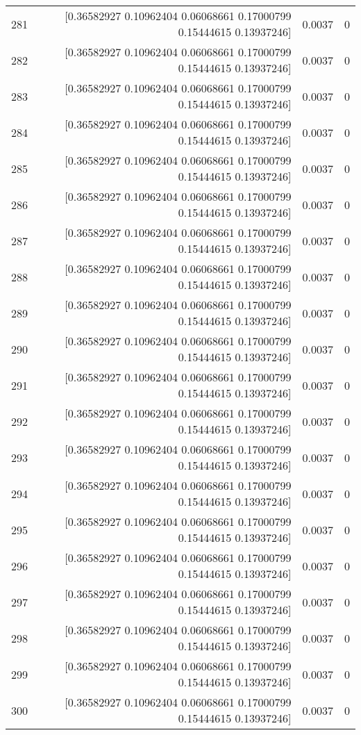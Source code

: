 \begin{longtable}{lrrr}
281 & [0.36582927 0.10962404 0.06068661 0.17000799 0.15444615 0.13937246] & 0.0037 & 0 \\
282 & [0.36582927 0.10962404 0.06068661 0.17000799 0.15444615 0.13937246] & 0.0037 & 0 \\
283 & [0.36582927 0.10962404 0.06068661 0.17000799 0.15444615 0.13937246] & 0.0037 & 0 \\
284 & [0.36582927 0.10962404 0.06068661 0.17000799 0.15444615 0.13937246] & 0.0037 & 0 \\
285 & [0.36582927 0.10962404 0.06068661 0.17000799 0.15444615 0.13937246] & 0.0037 & 0 \\
286 & [0.36582927 0.10962404 0.06068661 0.17000799 0.15444615 0.13937246] & 0.0037 & 0 \\
287 & [0.36582927 0.10962404 0.06068661 0.17000799 0.15444615 0.13937246] & 0.0037 & 0 \\
288 & [0.36582927 0.10962404 0.06068661 0.17000799 0.15444615 0.13937246] & 0.0037 & 0 \\
289 & [0.36582927 0.10962404 0.06068661 0.17000799 0.15444615 0.13937246] & 0.0037 & 0 \\
290 & [0.36582927 0.10962404 0.06068661 0.17000799 0.15444615 0.13937246] & 0.0037 & 0 \\
291 & [0.36582927 0.10962404 0.06068661 0.17000799 0.15444615 0.13937246] & 0.0037 & 0 \\
292 & [0.36582927 0.10962404 0.06068661 0.17000799 0.15444615 0.13937246] & 0.0037 & 0 \\
293 & [0.36582927 0.10962404 0.06068661 0.17000799 0.15444615 0.13937246] & 0.0037 & 0 \\
294 & [0.36582927 0.10962404 0.06068661 0.17000799 0.15444615 0.13937246] & 0.0037 & 0 \\
295 & [0.36582927 0.10962404 0.06068661 0.17000799 0.15444615 0.13937246] & 0.0037 & 0 \\
296 & [0.36582927 0.10962404 0.06068661 0.17000799 0.15444615 0.13937246] & 0.0037 & 0 \\
297 & [0.36582927 0.10962404 0.06068661 0.17000799 0.15444615 0.13937246] & 0.0037 & 0 \\
298 & [0.36582927 0.10962404 0.06068661 0.17000799 0.15444615 0.13937246] & 0.0037 & 0 \\
299 & [0.36582927 0.10962404 0.06068661 0.17000799 0.15444615 0.13937246] & 0.0037 & 0 \\
300 & [0.36582927 0.10962404 0.06068661 0.17000799 0.15444615 0.13937246] & 0.0037 & 0 \\

\end{longtable}
